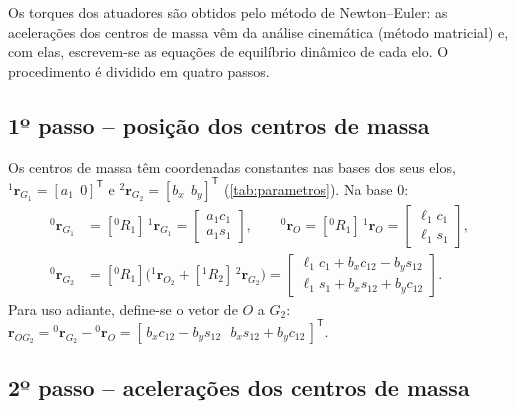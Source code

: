 \documentclass[12pt,a4paper,twoside]{article}
\newcommand{\rv}[2]{{}^{#1}\mathbf{r}_{#2}}          %
\newcommand{\Rm}[2]{[{}^{#1}R_{#2}]}                 %
\numberwithin{equation}{section}
\begin{document}
Os torques dos atuadores são obtidos pelo método de Newton--Euler: as acelerações dos
centros de massa vêm da análise cinemática (método matricial) e, com elas, escrevem-se as
equações de equilíbrio dinâmico de cada elo. O procedimento é dividido em quatro passos.

\subsection{1º passo -- posição dos centros de massa}

Os centros de massa têm coordenadas constantes nas bases dos seus elos,
$\rv{1}{G_1} = [a_1\ \ 0]^{\mathsf T}$ e $\rv{2}{G_2} = [b_x\ \ b_y]^{\mathsf T}$ (\cref{tab:parametros}). Na base $0$:
\begin{align}
  \rv{0}{G_1} &= \Rm{0}{1}\,\rv{1}{G_1} = \begin{bmatrix} a_1 c_1\\ a_1 s_1\end{bmatrix},
  \qquad
  \rv{0}{O} = \Rm{0}{1}\,\rv{1}{O} = \begin{bmatrix} \ell_1 c_1\\ \ell_1 s_1\end{bmatrix},\\
  \rv{0}{G_2} &= \Rm{0}{1}\Big(\rv{1}{O_2} + \Rm{1}{2}\,\rv{2}{G_2}\Big)
   = \begin{bmatrix} \ell_1 c_1 + b_x c_{12} - b_y s_{12}\\ \ell_1 s_1 + b_x s_{12} + b_y c_{12}\end{bmatrix}.
\end{align}
Para uso adiante, define-se o vetor de $O$ a $G_2$:
$\mathbf r_{OG_2} = \rv{0}{G_2} - \rv{0}{O} = [\,b_x c_{12} - b_y s_{12}\ \ \ b_x s_{12} + b_y c_{12}\,]^{\mathsf T}$.

\subsection{2º passo -- acelerações dos centros de massa}
\end{document}
